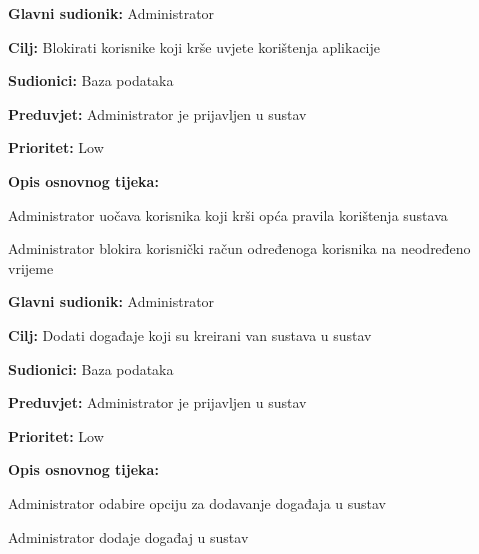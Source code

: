 \noindent {}
	\begin{packed_item}
		
		\item \textbf{Glavni sudionik: }Administrator
		\item \textbf{Cilj:} Blokirati korisnike koji krše uvjete korištenja aplikacije
		\item \textbf{Sudionici:} Baza podataka
		\item \textbf{Preduvjet:} Administrator je prijavljen u sustav
		\item \textbf{Prioritet:} Low
		\item \textbf{Opis osnovnog tijeka:}
		
		\item[] \begin{packed_enum}
			
			\item Administrator uočava korisnika koji krši opća pravila korištenja sustava
			\item Administrator blokira korisnički račun određenoga korisnika na neodređeno vrijeme
		\end{packed_enum}
	\end{packed_item}

\noindent {}
	\begin{packed_item}
		
		\item \textbf{Glavni sudionik: }Administrator
		\item \textbf{Cilj:} Dodati događaje koji su kreirani van sustava u sustav
		\item \textbf{Sudionici:} Baza podataka
		\item \textbf{Preduvjet:} Administrator je prijavljen u sustav
		\item \textbf{Prioritet:} Low
		\item \textbf{Opis osnovnog tijeka:}
		
		\item[] \begin{packed_enum}
			
			\item Administrator odabire opciju za dodavanje događaja u sustav
			\item Administrator dodaje događaj u sustav
		\end{packed_enum}
	\end{packed_item}

